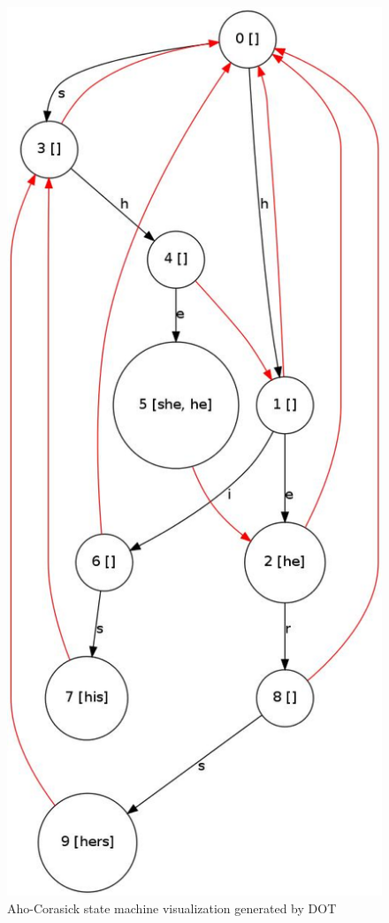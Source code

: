 \documentclass[10pt]{report}
\begin{document}
\begin{figure}
  \begin{center}
	\includegraphics[width=!,height=0.90\textheight]{aho4}
  \end{center}
  \caption{Aho-Corasick state machine visualization generated by DOT}
  \label{fig:dot}
\end{figure} 
\end{document}
